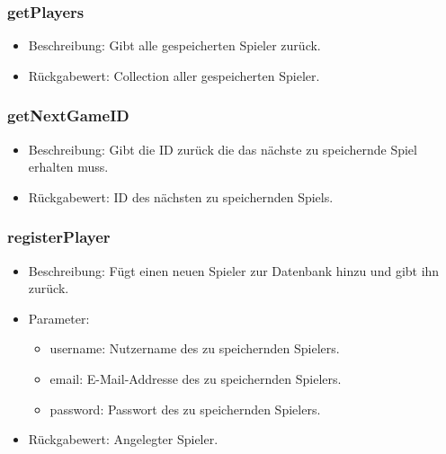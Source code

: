 \documentclass[a4paper]{scrreprt}
\begin{document}
    \subsubsection{getPlayers}
    \begin{itemize}
        \item Beschreibung: Gibt alle gespeicherten Spieler zurück.
        \item Rückgabewert: Collection aller gespeicherten Spieler.
    \end{itemize}

    \subsubsection{getNextGameID}
    \begin{itemize}
        \item Beschreibung: Gibt die ID zurück die das nächste zu speichernde Spiel erhalten muss.
        \item Rückgabewert: ID des nächsten zu speichernden Spiels.
    \end{itemize}

    \subsubsection{registerPlayer}
    \begin{itemize}
        \item Beschreibung: Fügt einen neuen Spieler zur Datenbank hinzu und gibt ihn zurück.
        \item Parameter:
        \begin{itemize}
            \item username: Nutzername des zu speichernden Spielers.
            \item email: E-Mail-Addresse des zu speichernden Spielers.
            \item password: Passwort des zu speichernden Spielers.
        \end{itemize}
        \item Rückgabewert: Angelegter Spieler.
    \end{itemize}
\end{document}
